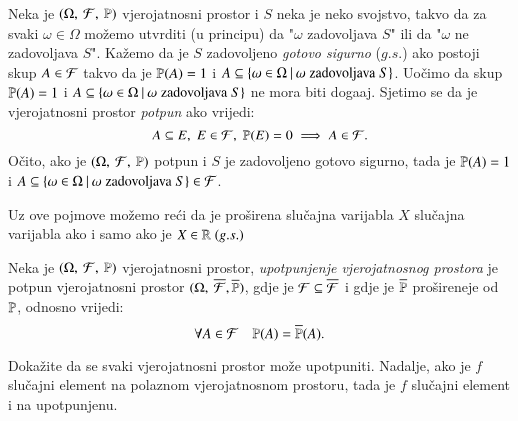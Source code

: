 \begin{nap} \label{nap:3.9}
    Neka je $(\Omega, \: \mathcal{F}, \: \mathbb{P})$ vjerojatnosni prostor i $S$ neka je neko svojstvo, takvo da za svaki $\omega \in \Omega$ mo\v zemo utvrditi (u principu) da "$\omega$ zadovoljava $S$" ili da "$\omega$ ne zadovoljava $S$".
    Ka\v zemo da je $S$ zadovoljeno \emph{gotovo sigurno} ($g.s.$) ako postoji skup $A \in \mathcal{F}$ takvo da je $\mathbb{P}({A}) = 1$ i $A \subseteq \{{\omega \in \Omega} \: | \: {\omega \; \textnormal{zadovoljava} \; S}\}$.
    Uo\v cimo da skup $\mathbb{P}({A}) = 1$ i $A \subseteq \{{\omega \in \Omega} \: | \: {\omega \; \textnormal{zadovoljava} \; S}\}$ ne mora biti doga\dj aj.
    Sjetimo se da je vjerojatnosni prostor \emph{potpun} ako vrijedi:
    \begin{equation*}
        A \subseteq E, \; E \in \mathcal{F}, \; \mathbb{P}({E}) = 0 \implies A \in \mathcal{F}.
    \end{equation*}
    O\v cito, ako je $(\Omega, \: \mathcal{F}, \: \mathbb{P})$ potpun i $S$ je zadovoljeno gotovo sigurno, tada je $\mathbb{P}({A}) = 1$ i $A \subseteq \{{\omega \in \Omega} \: | \: {\omega \; \textnormal{zadovoljava} \; S}\} \in \mathcal{F}$.

    Uz ove pojmove mo\v zemo re\' ci da je pro\v sirena slu\v cajna varijabla $X$ slu\v cajna varijabla ako i samo ako je $X \in \mathbb{R} \; (g.s.)$
\end{nap}

\begin{nap} \label{nap:3.9-1}
    Neka je $(\Omega, \: \mathcal{F}, \: \mathbb{P})$ vjerojatnosni prostor, \emph{upotpunjenje vjerojatnosnog prostora} je potpun vjerojatnosni prostor $(\Omega, \: \overline{\mathcal{F}}, \overline{\mathbb{P}})$, gdje je $\mathcal{F} \subseteq \overline{\mathcal{F}}$ i gdje je $\overline{\mathbb{P}}$ pro\v sireneje od $\mathbb{P}$, odnosno vrijedi:
    \begin{equation*}
        \forall A \in \mathcal{F} \quad \mathbb{P}({A}) = \overline{\mathbb{P}}(A).
    \end{equation*}
\end{nap}

\begin{zad} \label{zad:3.10}
    Doka\v zite da se svaki vjerojatnosni prostor mo\v ze upotpuniti.
    Nadalje, ako je $f$ slu\v cajni element na polaznom vjerojatnosnom
    prostoru, tada je $f$ slu\v cajni element i na upotpunjenu.
\end{zad}

%
%



